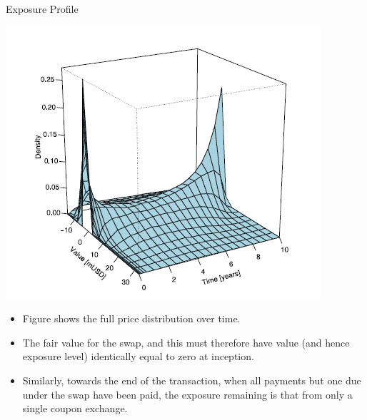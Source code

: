 \documentclass[11pt]{beamer}
\begin{document}
\begin{frame}{Exposure Profile}
\noindent\begin{minipage}{0.5\textwidth}%
\includegraphics[width=\linewidth]{img/profilo_3.png}
\end{minipage}%
\hfill%
\begin{minipage}{0.5\textwidth}
\begin{itemize}
\item Figure  shows  the full price distribution over time.
\item The fair value for the swap, and this must therefore have
value (and hence exposure level) identically equal to zero at inception. 
\item Similarly,
towards the end of the transaction, when all payments but one due under the swap
have been paid, the exposure remaining is that from only a single coupon exchange.
\end{itemize}
\end{minipage}
\end{frame}
\end{document}

